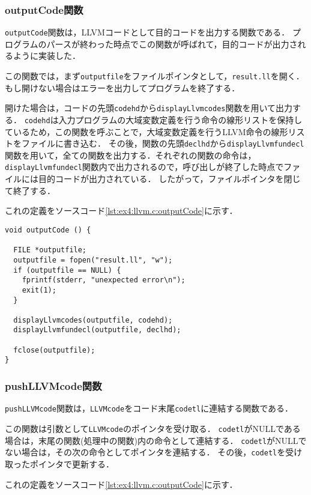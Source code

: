 \documentclass[uplatex]{jsarticle}
\begin{document}
\subsubsection{outputCode関数}
\verb#outputCode#関数は，LLVMコードとして目的コードを出力する関数である．
プログラムのパースが終わった時点でこの関数が呼ばれて，目的コードが出力されるように実装した．

この関数では，まず\verb#outputfile#をファイルポインタとして，\verb#result.ll#を開く．
もし開けない場合はエラーを出力してプログラムを終了する．

開けた場合は，コードの先頭\verb#codehd#から\verb#displayLlvmcodes#関数を用いて出力する．
\verb#codehd#は入力プログラムの大域変数定義を行う命令の線形リストを保持しているため，この関数を呼ぶことで，大域変数定義を行うLLVM命令の線形リストをファイルに書き込む．
その後，関数の先頭\verb#declhd#から\verb#displayLlvmfundecl#関数を用いて，全ての関数を出力する．それぞれの関数の命令は，\verb#displayLlvmfundecl#関数内で出力されるので，呼び出しが終了した時点でファイルには目的コードが出力されている．
したがって，ファイルポインタを閉じて終了する．

これの定義をソースコード\ref{lst:ex4:llvm.c:outputCode}に示す．

\begin{lstlisting}[caption=outputCode関数の定義,label=lst:ex4:llvm.c:outputCode]
void outputCode () {

  FILE *outputfile;
  outputfile = fopen("result.ll", "w");
  if (outputfile == NULL) {
    fprintf(stderr, "unexpected error\n");
    exit(1);
  }

  displayLlvmcodes(outputfile, codehd);
  displayLlvmfundecl(outputfile, declhd);

  fclose(outputfile);
}
\end{lstlisting}

\subsubsection{pushLLVMcode関数}
\verb#pushLLVMcode#関数は，\verb#LLVMcode#をコード末尾\verb#codetl#に連結する関数である．

この関数は引数として\verb#LLVMcode#のポインタを受け取る．
\verb#codetl#がNULLである場合は，末尾の関数(処理中の関数)内の命令として連結する．
\verb#codetl#がNULLでない場合は，その次の命令としてポインタを連結する．
その後，\verb#codetl#を受け取ったポインタで更新する．

これの定義をソースコード\ref{lst:ex4:llvm.c:outputCode}に示す．
\end{document}
